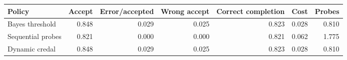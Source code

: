 \begin{tabular}{@{}lrrrrrr@{}}
\toprule
Policy & Accept & Error/accepted & Wrong accept & Correct completion & Cost & Probes\\
\midrule
Bayes threshold & 0.848 & 0.029 & 0.025 & 0.823 & 0.028 & 0.810\\
Sequential probes & 0.821 & 0.000 & 0.000 & 0.821 & 0.062 & 1.775\\
Dynamic credal & 0.848 & 0.029 & 0.025 & 0.823 & 0.028 & 0.810\\
\bottomrule
\end{tabular}
